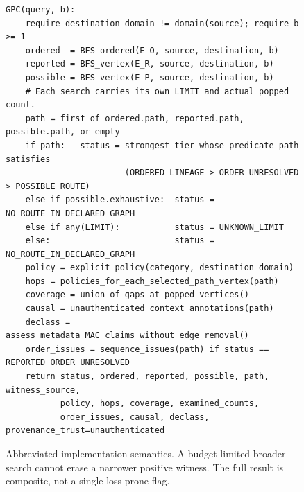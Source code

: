 \documentclass[11pt,letterpaper]{article}
\begin{document}
\begin{figure}[htbp]
\begin{lstlisting}
GPC(query, b):
    require destination_domain != domain(source); require b >= 1
    ordered  = BFS_ordered(E_O, source, destination, b)
    reported = BFS_vertex(E_R, source, destination, b)
    possible = BFS_vertex(E_P, source, destination, b)
    # Each search carries its own LIMIT and actual popped count.
    path = first of ordered.path, reported.path, possible.path, or empty
    if path:   status = strongest tier whose predicate path satisfies
                        (ORDERED_LINEAGE > ORDER_UNRESOLVED > POSSIBLE_ROUTE)
    else if possible.exhaustive:  status = NO_ROUTE_IN_DECLARED_GRAPH
    else if any(LIMIT):           status = UNKNOWN_LIMIT
    else:                         status = NO_ROUTE_IN_DECLARED_GRAPH
    policy = explicit_policy(category, destination_domain)
    hops = policies_for_each_selected_path_vertex(path)
    coverage = union_of_gaps_at_popped_vertices()
    causal = unauthenticated_context_annotations(path)
    declass = assess_metadata_MAC_claims_without_edge_removal()
    order_issues = sequence_issues(path) if status == REPORTED_ORDER_UNRESOLVED
    return status, ordered, reported, possible, path, witness_source,
           policy, hops, coverage, examined_counts,
           order_issues, causal, declass, provenance_trust=unauthenticated
\end{lstlisting}
\caption{Abbreviated implementation semantics. A budget-limited broader search cannot erase a narrower positive witness. The full result is composite, not a single loss-prone flag.}
\label{fig:algorithm}
\end{figure}
\end{document}
